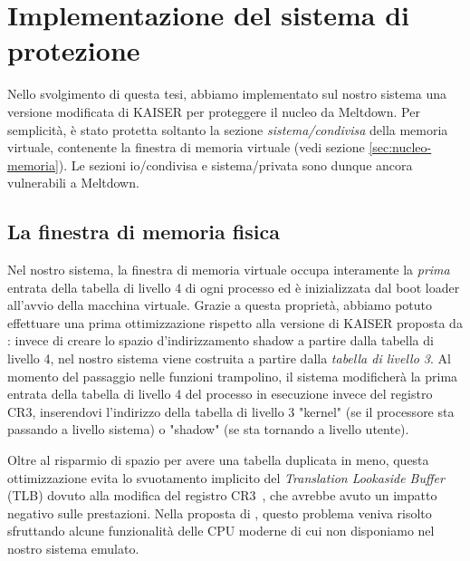 \chapter{Implementazione del sistema di protezione}
\label{cap:implementazione}
Nello svolgimento di questa tesi, abbiamo implementato sul nostro sistema una versione modificata di KAISER per proteggere il nucleo da Meltdown. 
Per semplicità, è stato protetta soltanto la sezione \emph{sistema/condivisa} della memoria virtuale, contenente la finestra di memoria virtuale (vedi sezione \vref{sec:nucleo-memoria}).
Le sezioni io/condivisa e sistema/privata sono dunque ancora vulnerabili a Meltdown.

\section{La finestra di memoria fisica}
Nel nostro sistema, la finestra di memoria virtuale occupa interamente la \emph{prima} entrata della tabella di livello 4 di ogni processo ed è inizializzata dal boot loader all'avvio della macchina virtuale.
Grazie a questa proprietà, abbiamo potuto effettuare una prima ottimizzazione rispetto alla versione di KAISER proposta da \textcite{gruss:kaslr}: invece di creare lo spazio d'indirizzamento shadow a partire dalla tabella di livello 4, nel nostro sistema viene costruita a partire dalla \emph{tabella di livello 3}.
Al momento del passaggio nelle funzioni trampolino, il sistema modificherà la prima entrata della tabella di livello 4 del processo in esecuzione invece del registro CR3, inserendovi l'indirizzo della tabella di livello 3 "kernel" (se il processore sta passando a livello sistema) o "shadow" (se sta tornando a livello utente).

Oltre al risparmio di spazio per avere una tabella duplicata in meno, questa ottimizzazione evita lo svuotamento implicito del \emph{Translation Lookaside Buffer} (TLB) dovuto alla modifica del registro CR3~\cite{gruss:kaslr}, che avrebbe avuto un impatto negativo sulle prestazioni. 
Nella proposta di \textcite{gruss:kaslr}, questo problema veniva risolto sfruttando alcune funzionalità delle CPU moderne di cui non disponiamo nel nostro sistema emulato.

